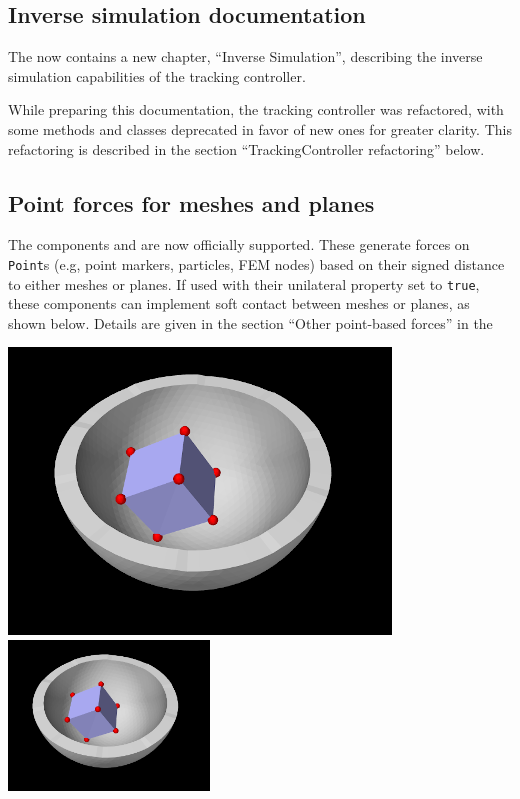 \documentclass{article}
\begin{document}
\subsection{Inverse simulation documentation}

The  now contains a new chapter,
``Inverse Simulation'', describing the inverse simulation capabilities of the
tracking controller.

While preparing this documentation, the tracking controller was refactored,
with some methods and classes deprecated in favor of new ones for greater
clarity. This refactoring is described in the section ``TrackingController
refactoring'' below.

\subsection{Point forces for meshes and planes}

The components  and
 are now officially
supported. These generate forces on {\tt Point}s (e.g, point markers,
particles, FEM nodes) based on their signed distance to either meshes or
planes.  If used with their {\sf unilateral} property set to {\tt true}, these
components can implement soft contact between meshes or planes, as shown below.
Details are given in the section ``Other point-based forces'' in the
%
\begin{center}
\iflatexml
 \includegraphics[]{../modelguide/images/PointMeshForces}
\else
 \includegraphics[width=0.4\textwidth]{../modelguide/images/PointMeshForces}
\fi
\end{center}
%
\end{document}

